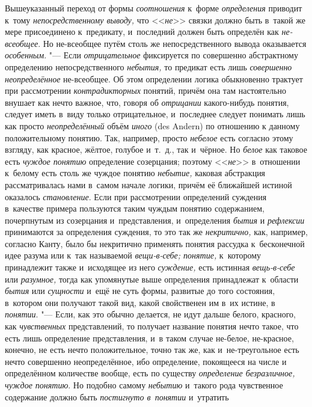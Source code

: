 Вышеуказанный переход от формы {\em соотношения} к~форме {\em определения}
приводит к~тому {\em непосредственному выводу,} что <<{\em не}>> связки должно
быть в~такой же мере присоединено к~предикату, и~последний должен быть
определён как {\em не-всеобщее}. Но не-всеобщее путём столь же
непосредственного вывода оказывается {\em особенным}. "--- Если
{\em отрицательное} фиксируется по совершенно абстрактному определению
непосредственного {\em небытия,} то предикат есть лишь {\em совершенно
неопределённое} не-всеобщее. Об этом определении логика обыкновенно трактует
при рассмотрении {\em контрадикторных} понятий, причём она там настоятельно
внушает как нечто важное, что, говоря об {\em отрицании} какого-нибудь понятия,
следует иметь в~виду только отрицательное, и~последнее следует понимать лишь
как просто {\em неопределённый} объём {\em иного} (des Andern) по отношению к
данному положительному понятию. Так, например, просто {\em небелое} есть
согласно этому взгляду, как красное, жёлтое, голубое и~т.~д., так и~чёрное.
Но {\em белое} как таковое есть {\em чуждое понятию} определение созерцания;
поэтому <<{\em не}>> в~отношении к~белому есть столь же чуждое понятию
{\em небытие,} каковая абстракция рассматривалась нами в~самом начале логики,
причём её ближайшей истиной оказалось {\em становление}. Если при рассмотрении
определений суждения в~качестве примера пользуются таким чуждым понятию
содержанием, почерпнутым из созерцания и~представления, и~определения
{\em бытия} и {\em рефлексии} принимаются за определения суждения, то это так
же {\em некритично,} как, например, согласно Канту, было бы некритично
применять понятия рассудка к~бесконечной идее разума или к~так называемой
{\em вещи-в-себе; понятие,} к~которому принадлежит также и~исходящее из него
{\em суждение,} есть истинная {\em вещь-в-себе} или {\em разумное,} тогда как
упомянутые выше определения принадлежат к~области {\em бытия} или
{\em сущности} и~ещё не суть формы, развитые до того состояния, в~котором они
получают такой вид, какой свойственен им в~их истине, в {\em понятии}. "---
Если, как это обычно делается, не идут дальше белого, красного, как
{\em чувственных} представлений, то получает название понятия нечто такое, что
есть лишь определение представления, и~в таком случае не-белое, не-красное,
конечно, не есть нечто положительное, точно так же, как и~не-треугольное есть
нечто совершенно неопределённое, ибо определение, покоящееся на числе и
определённом количестве вообще, есть по существу {\em определение
безразличное, чуждое понятию}. Но подобно самому {\em небытию} и~такого
рода чувственное содержание должно быть {\em постигнуто в~понятии} и~утратить

